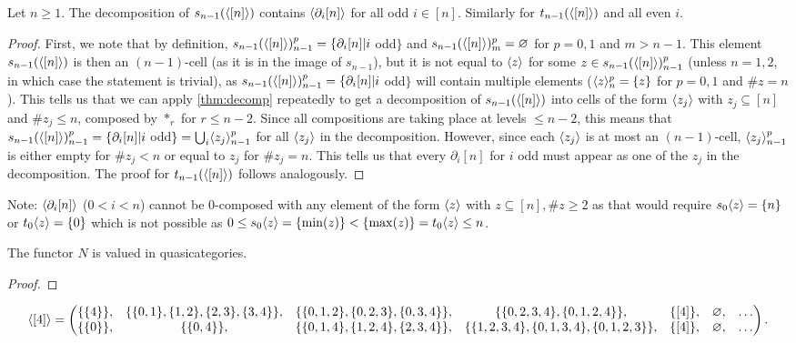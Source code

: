 \documentclass{article}
\begin{document}
\begin{lem}
    Let $n\geq1$. The decomposition of $s_{n-1}(\langle[n]\rangle)$ contains $\langle\partial_i[n]\rangle$ for all odd $i\in[n]$. Similarly for $t_{n-1}(\langle[n]\rangle)$ and all even $i$.
\end{lem}
\begin{proof}
    First, we note that by definition, $s_{n-1}(\langle[n]\rangle)_{n-1}^p=\{\partial_i[n]|i$ odd$\}$ and $s_{n-1}(\langle[n]\rangle)_{m}^p=\varnothing$ for $p=0,1$ and $m>n-1$. This element $s_{n-1}(\langle[n]\rangle)$ is then an $(n-1)$-cell (as it is in the image of $s_{n-1}$), but it is not equal to $\langle z\rangle$ for some $z\in s_{n-1}(\langle[n]\rangle)_{n-1}^p$ (unless $n=1,2$, in which case the statement is trivial), as $s_{n-1}(\langle[n]\rangle)_{n-1}^p=\{\partial_i[n]|i$ odd$\}$ will contain multiple elements ($\langle z\rangle_n^p=\{z\}$ for $p=0,1$ and $\#z=n$). This tells us that we can apply \ref{thm:decomp} repeatedly to get a decomposition of $s_{n-1}(\langle[n]\rangle)$ into cells of the form $\langle z_j\rangle$ with $z_j\subseteq[n]$ and $\#z_j\leq n$, composed by $*_r$ for $r\leq n-2$. Since all compositions are taking place at levels $\leq n-2$, this means that $s_{n-1}(\langle[n]\rangle)_{n-1}^p=\{\partial_i[n]|i$ odd$\}=\bigcup_i\langle z_j\rangle_{n-1}^p$ for all $\langle z_j\rangle$ in the decomposition. However, since each $\langle z_j\rangle$ is at most an $(n-1)$-cell, $\langle z_j\rangle_{n-1}^p$ is either empty for $\#z_j<n$ or equal to $z_j$ for $\#z_j=n$. This tells us that every $\partial_i[n]$ for $i$ odd must appear as one of the $z_j$ in the decomposition. The proof for $t_{n-1}(\langle[n]\rangle)$ follows analogously.
\end{proof}

Note: $\langle\partial_i[n]\rangle$ ($0<i<n$) cannot be 0-composed with any element of the form $\langle z\rangle$ with $z\subseteq[n],\#z\geq2$ as that would require $s_0\langle z\rangle=\{n\}$ or $t_0\langle z\rangle=\{0\}$ which is not possible as $0\leq s_0\langle z\rangle=\{\min(z)\}<\{\max(z)\}=t_0\langle z\rangle\leq n$. %

\begin{thm}
    The functor $N$ is valued in quasicategories.
\end{thm}
\begin{proof}
    
\end{proof}

\newpage

$$ \langle[4]\rangle=\begin{pmatrix}
        \{\{4\}\}, & \{\{0,1\},\{1,2\},\{2,3\},\{3,4\}\}, & \{\{0,1,2\},\{0,2,3\},\{0,3,4\}\}, & \{\{0,2,3,4\},\{0,1,2,4\}\}, & \{[4]\}, & \varnothing, & \dots\\
        \{\{0\}\}, & \{\{0,4\}\}, & \{\{0,1,4\},\{1,2,4\},\{2,3,4\}\}, & \{\{1,2,3,4\},\{0,1,3,4\},\{0,1,2,3\}\}, & \{[4]\}, & \varnothing, & \dots\\
    \end{pmatrix}. $$
\end{document}
